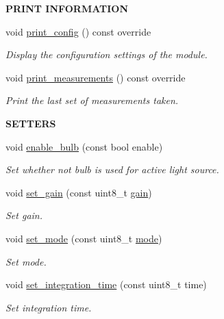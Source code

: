 \begin{Indent}{\bf P\+R\+I\+NT I\+N\+F\+O\+R\+M\+A\+T\+I\+ON}\par
\begin{DoxyCompactItemize}
\item 
void \hyperlink{class_loom___a_s7262_a29aef77c6d06feb46bc840f4407abba7}{print\+\_\+config} () const override
\begin{DoxyCompactList}\small\item\em Display the configuration settings of the module. \end{DoxyCompactList}\item 
void \hyperlink{class_loom___a_s7262_a684921cffa4f3ab9457138e05d8f4b88}{print\+\_\+measurements} () const override
\begin{DoxyCompactList}\small\item\em Print the last set of measurements taken. \end{DoxyCompactList}\end{DoxyCompactItemize}
\end{Indent}
\begin{Indent}{\bf S\+E\+T\+T\+E\+RS}\par
\begin{DoxyCompactItemize}
\item 
void \hyperlink{class_loom___a_s7262_aa0f5c88f3b0568e88353eb97064b9109}{enable\+\_\+bulb} (const bool enable)
\begin{DoxyCompactList}\small\item\em Set whether not bulb is used for active light source. \end{DoxyCompactList}\item 
void \hyperlink{class_loom___a_s7262_a67adc6edbb6889372491c4c2b5e88bee}{set\+\_\+gain} (const uint8\+\_\+t \hyperlink{class_loom___a_s7262_a3a9fc889a169e21181fa703ea152147d}{gain})
\begin{DoxyCompactList}\small\item\em Set gain. \end{DoxyCompactList}\item 
void \hyperlink{class_loom___a_s7262_a7ce8591d9d8ad10202d375f49b27db2c}{set\+\_\+mode} (const uint8\+\_\+t \hyperlink{class_loom___a_s7262_afae9fa2dc1e8bac95947f957449212f2}{mode})
\begin{DoxyCompactList}\small\item\em Set mode. \end{DoxyCompactList}\item 
void \hyperlink{class_loom___a_s7262_a6df02eb46ccb2226bad6c2be58e5ace1}{set\+\_\+integration\+\_\+time} (const uint8\+\_\+t time)
\begin{DoxyCompactList}\small\item\em Set integration time. \end{DoxyCompactList}\end{DoxyCompactItemize}
\end{Indent}
